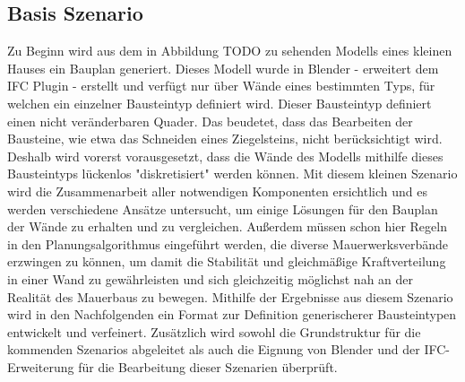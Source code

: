 \subsection{Basis Szenario}
Zu Beginn wird aus dem in Abbildung TODO zu sehenden Modells eines kleinen Hauses ein Bauplan generiert.
Dieses Modell wurde in Blender - erweitert dem IFC Plugin - erstellt und verfügt nur über Wände eines bestimmten Typs, für welchen ein einzelner Bausteintyp definiert wird.
Dieser Bausteintyp definiert einen nicht veränderbaren Quader.
Das beudetet, dass das Bearbeiten der Bausteine, wie etwa das Schneiden eines Ziegelsteins, nicht berücksichtigt wird.
Deshalb wird vorerst vorausgesetzt, dass die Wände des Modells mithilfe dieses Bausteintyps lückenlos "diskretisiert" werden können.
Mit diesem kleinen Szenario wird die Zusammenarbeit aller notwendigen Komponenten ersichtlich und es werden verschiedene Ansätze untersucht, um einige Lösungen für den Bauplan der Wände zu erhalten und zu vergleichen.
Außerdem müssen schon hier Regeln in den Planungsalgorithmus eingeführt werden, die diverse Mauerwerksverbände erzwingen zu können, um damit die Stabilität und gleichmäßige Kraftverteilung in einer Wand zu gewährleisten und sich gleichzeitig möglichst nah an der Realität des Mauerbaus zu bewegen.
Mithilfe der Ergebnisse aus diesem Szenario wird in den Nachfolgenden ein Format zur Definition generischerer Bausteintypen entwickelt und verfeinert.
Zusätzlich wird sowohl die Grundstruktur für die kommenden Szenarios abgeleitet als auch die Eignung von Blender und der IFC-Erweiterung für die Bearbeitung dieser Szenarien überprüft.

